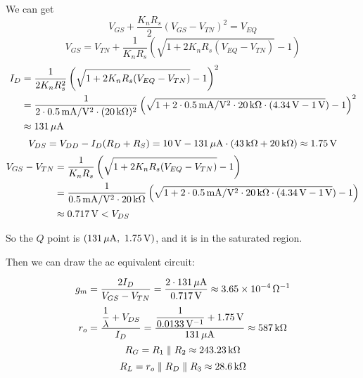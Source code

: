 \documentclass{article}
\newcommand{\unit}[1]{{\rm\,#1}}
\begin{document}
We can get $$V_{GS}+\frac{K_nR_s}{2}(V_{GS}-V_{TN})^2=V_{EQ}$$
$$V_{GS}=V_{TN}+\frac{1}{K_nR_s}\left(\sqrt{1+2K_nR_s(V_{EQ}-V_{TN})}-1\right)$$
\begin{align*}
I_D&=\frac{1}{2K_nR_s^2}\left(\sqrt{1+2K_nR_s(V_{EQ}-V_{TN})}-1\right)^2\\
&=\frac{1}{2\cdot0.5\unit{mA/V^2}\cdot(20\unit{k\Omega})^2}\left(\sqrt{1+2\cdot0.5\unit{mA/V^2}\cdot20\unit{k\Omega}\cdot(4.34\unit{V}-1\unit{V}})-1\right)^2\\
&\approx131\unit{\mu A}
\end{align*}
$$V_{DS}=V_{DD}-I_D(R_D+R_S)=10\unit{V}-131\unit{\mu A}\cdot(43\unit{k\Omega}+20\unit{k\Omega})\approx1.75\unit{V}$$
\begin{align*}
V_{GS}-V_{TN}&=\frac{1}{K_nR_s}\left(\sqrt{1+2K_nR_s(V_{EQ}-V_{TN})}-1\right)\\
&=\frac{1}{0.5\unit{mA/V^2}\cdot20\unit{k\Omega}}\left(\sqrt{1+2\cdot0.5\unit{mA/V^2}\cdot20\unit{k\Omega}\cdot(4.34\unit{V}-1\unit{V}})-1\right)\\
&\approx0.717\unit{V}<V_{DS}
\end{align*}

So the $Q$ point is $(131\unit{\mu A},\ 1.75\unit{V})$, and it is in the saturated region.

Then we can draw the ac equivalent circuit:
\begin{center}
\end{center}

$$g_m=\frac{2I_D}{V_{GS}-V_{TN}}=\frac{2\cdot131\unit{\mu A}}{0.717\unit{V}}\approx3.65\times10^{-4}\unit{\Omega^{-1}}$$
$$r_o=\frac{\dfrac{1}{\lambda}+V_{DS}}{I_D}=\frac{\dfrac{1}{0.0133\unit{V^{-1}}}+1.75\unit{V}}{131\unit{\mu A}}\approx587\unit{k\Omega}$$
$$R_G=R_1\parallel R_2\approx243.23\unit{k\Omega}$$
$$R_L=r_o\parallel R_D\parallel R_3\approx28.6\unit{k\Omega}$$
\end{document}
